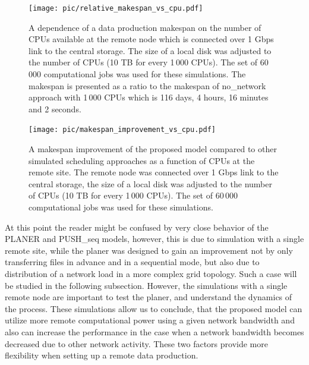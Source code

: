 \documentclass{svjour3}                     %
\begin{document}
\begin{figure}[h]
\centering
\begin{minipage}{1\textwidth}
\centering
    \texttt{[image: pic/relative\_makespan\_vs\_cpu.pdf]}

    \caption{A dependence of a data production makespan on the number of CPUs available at the remote node which is connected over 1 Gbps link to the central storage. The size of a local disk was adjusted to the number of CPUs (10 TB for every 1\,000 CPUs). The set of 60\,000 computational jobs was used for these simulations. The makespan is presented as a ratio to the makespan of no\_network approach with 1\,000 CPUs which is 116 days, 4 hours, 16 minutes and 2 seconds.}
    \label{relative_makespan_vs_cpu}
\end{minipage}\hspace{1pc}%
\begin{minipage}{1\textwidth}
\centering
    \texttt{[image: pic/makespan\_improvement\_vs\_cpu.pdf]}
    \caption{A makespan improvement of the proposed model compared to other simulated scheduling approaches as a function of CPUs at the remote site. The remote node was connected over 1 Gbps link to the central storage, the size of a local disk was adjusted to the number of CPUs (10 TB for every 1\,000 CPUs). The set of 60\,000 computational jobs was used for these simulations.}
    \label{makespan_improvement_vs_cpu}
\end{minipage} 
\end{figure}

At this point the reader might be confused by very close behavior of the PLANER and PUSH\_seq models, however, this is due to simulation with a single remote site, while the planer was designed to gain an improvement not by only  transferring files in advance and in a sequential mode, but also due to distribution of a network load in a more complex grid topology. Such a case will be studied in the following subsection. However, the simulations with a single remote node are important to test the planer, and understand the dynamics of the process. These simulations allow us to conclude, that the proposed model can utilize more remote computational power using a given network bandwidth and also can increase the performance in the case when a network bandwidth becomes decreased due to other network activity. These two factors provide more flexibility when setting up a remote data production.
\end{document}
